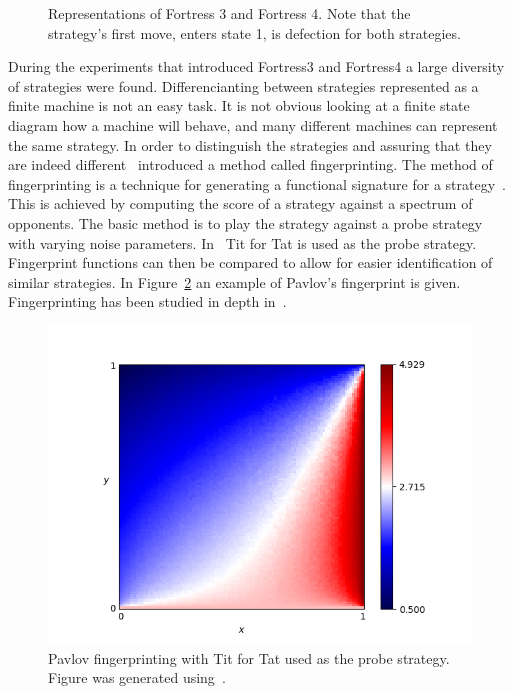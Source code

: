\documentclass{article}
\theoremstyle{definition}
\begin{document}
\begin{figure}[!hbtp]
\centering
    \begin{subfigure}{.4\textwidth}
        
    \end{subfigure}
    \begin{subfigure}{.4\textwidth}\centering
        
     \end{subfigure}
     \caption{Representations of Fortress 3 and Fortress 4. Note that the
     strategy's first move, enters state 1, is defection for both strategies.}
     \label{fig:fortress3_and_4}
\end{figure}

During the experiments that introduced Fortress3 and Fortress4 a large diversity
of strategies were found. Differencianting between strategies represented as 
a finite machine is not an easy task.  It is not obvious looking at a finite
state diagram how a machine will behave, and many different machines can represent
the same strategy.
In order to distinguish
the strategies and assuring that they are indeed different~\cite{Ashlock2005}
introduced a method called fingerprinting.
The method of fingerprinting is a technique for generating a functional signature for a
strategy~\cite{Ashlock2008}. This is achieved by computing the score of a strategy
against a spectrum of opponents. The basic method is to play the strategy
against a probe strategy with varying noise parameters. In~\cite{Ashlock2005}
Tit for Tat is used as the probe strategy. Fingerprint functions
can then be compared to allow for easier identification of similar strategies.
In Figure~\ref{fig:fingerprinting} an example of Pavlov's fingerprint is given.
Fingerprinting has been studied in depth in~\cite{Ashlock2008, Ashlock2009,
Ashlock2010, Ashlock2006a}.

\begin{figure}[!hbtp]
    \centering
    \includegraphics[height=.3\textheight]{./assets/images/Win-Stay_Lose-Shift.png}
    \caption{Pavlov fingerprinting with Tit for Tat used as the probe strategy.
    Figure was generated using~\cite{axelrodproject}.}
    \label{fig:fingerprinting}
\end{figure}
\end{document}
